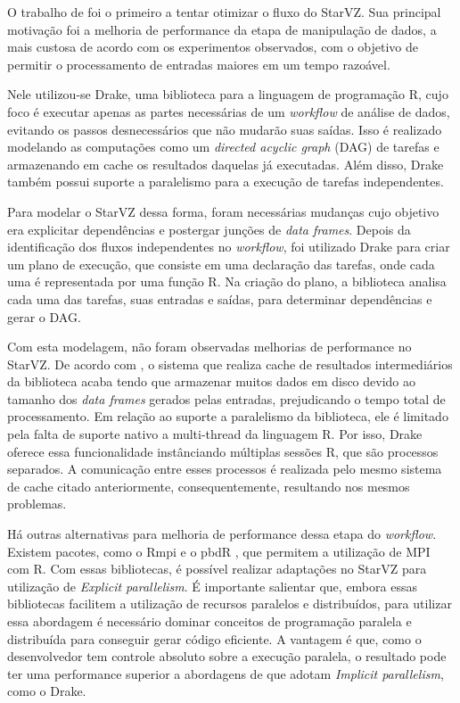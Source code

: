 O trabalho de \citet{ref:drakestarvz} foi o primeiro a tentar otimizar o fluxo do StarVZ. 
Sua principal motivação foi a melhoria de performance da etapa de manipulação de dados, a mais
custosa de acordo com os experimentos observados, com o objetivo de permitir o processamento de 
entradas maiores em um tempo razoável.

Nele utilizou-se Drake, uma biblioteca para a linguagem de programação R, cujo foco é executar apenas as 
partes necessárias de um \emph{workflow} de análise de dados, evitando os passos desnecessários que não mudarão
suas saídas. Isso é realizado modelando as computações como um \emph{directed acyclic graph} (DAG) de tarefas e 
armazenando em cache os resultados daquelas já executadas. Além disso, Drake também possui suporte a paralelismo
para a execução de tarefas independentes.

Para modelar o StarVZ dessa forma, foram necessárias mudanças cujo objetivo era explicitar 
dependências e postergar junções de \emph{data frames}. Depois da identificação dos fluxos independentes 
no \emph{workflow}, foi utilizado Drake para criar um plano de execução, que consiste em uma declaração
das tarefas, onde cada uma é representada por uma função R. Na criação do plano, a biblioteca analisa cada
uma das tarefas, suas entradas e saídas, para determinar dependências e gerar o DAG.

Com esta modelagem, não foram observadas melhorias de performance no StarVZ. De acordo com \citet{ref:drakestarvz},
o sistema que realiza cache de resultados intermediários da biblioteca acaba tendo que armazenar muitos dados em disco devido
ao tamanho dos \emph{data frames} gerados pelas entradas, prejudicando o tempo total de processamento.
Em relação ao suporte a paralelismo da biblioteca, ele é limitado pela falta de suporte nativo a multi-thread da linguagem R.
Por isso, Drake oferece essa funcionalidade instânciando múltiplas sessões R, que são processos separados. A comunicação
entre esses processos é realizada pelo mesmo sistema de cache citado anteriormente, consequentemente, resultando nos mesmos
problemas.

Há outras alternativas para melhoria de performance dessa etapa do \emph{workflow}. Existem pacotes, como o Rmpi \cite{ref:rmpi}
e o pbdR \cite{ref:pbdr}, que permitem a utilização de MPI com R. Com essas bibliotecas, é possível realizar adaptações no 
StarVZ para utilização de \emph{Explicit parallelism}. É importante salientar que, embora essas bibliotecas facilitem a 
utilização de recursos paralelos e distribuídos, para utilizar essa abordagem é necessário dominar conceitos de programação
paralela e distribuída para conseguir gerar código eficiente. A vantagem é que, como o desenvolvedor tem controle absoluto sobre
a execução paralela, o resultado pode ter uma performance superior a abordagens de que adotam \emph{Implicit parallelism}, como o Drake.